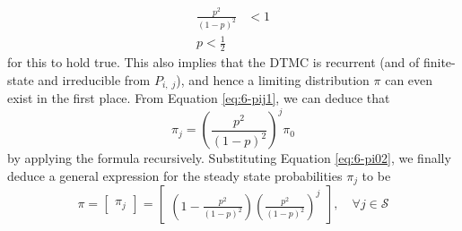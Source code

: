 \documentclass[12pt]{article}
\begin{document}
\begin{align*}
    \frac{p^{2}}{(1-p)^{2}} &< 1 \\ 
    p < \frac{1}{2}
\end{align*} for this to hold true. This also implies that the DTMC is recurrent (and of finite-state and irreducible from $P_{i,\;j}$), and hence a limiting distribution $\pi$ can even exist in the first place. From Equation \ref{eq:6-pij1}, we can deduce that \begin{equation}
    \pi_{j} = \left( \frac{p^{2}}{(1-p)^{2}} \right)^{j} \pi_0
\end{equation} by applying the formula recursively. Substituting Equation \ref{eq:6-pi02}, we finally deduce a general expression for the steady state probabilities $\pi_j$ to be \begin{equation}
    \pi = \begin{bmatrix}
        \pi_j
    \end{bmatrix} = \begin{bmatrix}
        \left( 1- \displaystyle\frac{p^{2}}{(1-p)^{2}} \right)\left( \displaystyle\frac{p^{2}}{(1-p)^{2}} \right)^{j}
    \end{bmatrix}, \quad \forall j \in \mathcal{S}
\end{equation}



% 
% 
\end{document}
